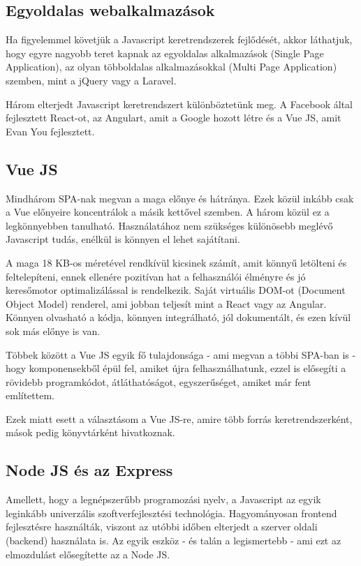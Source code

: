 \subsection{Egyoldalas webalkalmazások}

Ha figyelemmel követjük a Javascript keretrendszerek fejlődését, akkor láthatjuk, hogy egyre nagyobb teret kapnak az egyoldalas alkalmazások (Single Page Application), az olyan többoldalas alkalmazásokkal (Multi Page Application) szemben, mint a jQuery vagy a Laravel.

Három elterjedt Javascript keretrendszert különböztetünk meg. A Facebook által fejlesztett React-ot, az Angulart, amit a Google hozott létre és a Vue JS, amit Evan You fejlesztett.
\cite{vue}

\subsection{Vue JS}

Mindhárom SPA-nak megvan a maga előnye és hátránya. Ezek közül inkább csak a Vue előnyeire koncentrálok a másik kettővel szemben. A három közül ez a legkönnyebben tanulható. Használatához nem szükséges különösebb meglévő Javascript tudás, enélkül is könnyen el lehet sajátítani.

A maga 18 KB-os méretével rendkívül kicsinek számít, amit könnyű letölteni és feltelepíteni, ennek ellenére pozitívan hat a felhasználói élményre és jó keresőmotor optimalizálással is rendelkezik. Saját virtuális DOM-ot (Document Object Model) renderel, ami jobban teljesít mint a React vagy az Angular. Könnyen olvasható a kódja, könnyen integrálható, jól dokumentált, és ezen kívül sok más előnye is van.

Többek között a Vue JS egyik fő tulajdonsága - ami megvan a többi SPA-ban is - hogy komponensekből épül fel, amiket újra felhasználhatunk, ezzel is elősegíti a rövidebb programkódot, átláthatóságot, egyszerűséget, amiket már fent említettem.

Ezek miatt esett a választásom a Vue JS-re, amire több forrás keretrendszerként, mások pedig könyvtárként hivatkoznak.
\cite{vue}

\subsection{Node JS és az Express}

Amellett, hogy a legnépszerűbb programozási nyelv, a Javascript az egyik leginkább univerzális szoftverfejlesztési technológia. Hagyományosan frontend fejlesztésre használták, viszont az utóbbi időben elterjedt a szerver oldali (backend) használata is. Az egyik eszköz - és talán a legismertebb - ami ezt az elmozdulást elősegítette az a Node JS.

